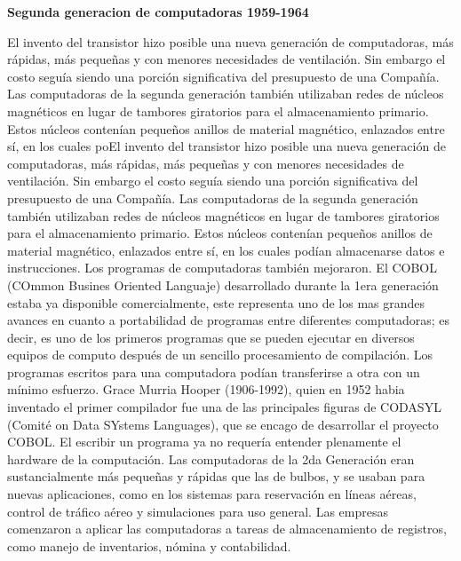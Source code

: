 \documentclass[10pt,a4paper]{article}
\begin{document}
\begin{multicols}{2}
 \begin{center}
\textbf{Segunda generacion de computadoras 1959-1964 }
\end{center} 
El invento del transistor hizo posible una nueva generación de computadoras, más rápidas, más pequeñas y con menores necesidades de ventilación. Sin embargo el costo seguía siendo una porción significativa del presupuesto de una Compañía. Las computadoras de la segunda generación también utilizaban redes de núcleos magnéticos en lugar de tambores giratorios para el almacenamiento primario. Estos núcleos contenían pequeños anillos de material magnético, enlazados entre sí, en los cuales poEl invento del transistor hizo posible una nueva generación de computadoras, más rápidas, más pequeñas y con menores necesidades de ventilación. Sin embargo el costo seguía siendo una porción significativa del presupuesto de una Compañía. Las computadoras de la segunda generación también utilizaban redes de núcleos magnéticos en lugar de tambores giratorios para el almacenamiento primario. Estos núcleos contenían pequeños anillos de material magnético, enlazados entre sí, en los cuales podían almacenarse datos e instrucciones.
Los programas de computadoras también mejoraron. El COBOL (COmmon Busines Oriented Languaje) desarrollado durante la 1era generación estaba ya disponible comercialmente, este representa uno de los mas grandes avances en cuanto a portabilidad de programas entre diferentes computadoras; es decir, es uno de los primeros programas que se pueden ejecutar en diversos equipos de computo después de un sencillo procesamiento de compilación. Los programas escritos para una computadora podían transferirse a otra con un mínimo esfuerzo. Grace Murria Hooper (1906-1992), quien en 1952 habia inventado el primer compilador fue una de las principales figuras de CODASYL (Comité on Data SYstems Languages), que se encago de desarrollar el proyecto COBOL. El escribir un programa ya no requería entender plenamente el hardware de la computación. Las computadoras de la 2da Generación eran sustancialmente más pequeñas y rápidas que las de bulbos, y se usaban para nuevas aplicaciones, como en los sistemas para reservación en líneas aéreas, control de tráfico aéreo y simulaciones para uso general. Las empresas comenzaron a aplicar las computadoras a tareas de almacenamiento de registros, como manejo de inventarios, nómina y contabilidad.
 

\end{multicols}
\end{document}
